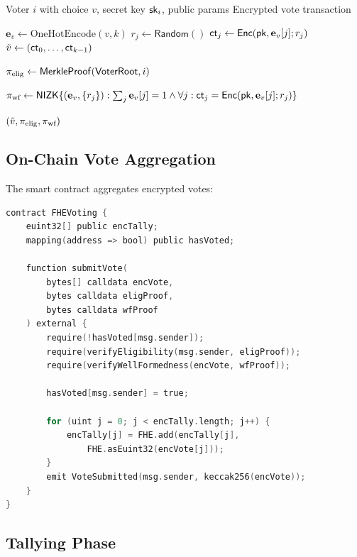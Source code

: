 \documentclass{../shared/luxfhe}
\begin{document}
\begin{algorithm}
\caption{Vote Submission}
\begin{algorithmic}[1]
\Require Voter $i$ with choice $v$, secret key $\mathsf{sk}_i$, public params
\Ensure Encrypted vote transaction

\State $\mathbf{e}_v \gets \text{OneHotEncode}(v, k)$
    \State $r_j \gets \mathsf{Random}()$
    \State $\mathsf{ct}_j \gets \mathsf{Enc}(\mathsf{pk}, \mathbf{e}_v[j]; r_j)$
\EndFor
\State $\tilde{v} \gets (\mathsf{ct}_0, \ldots, \mathsf{ct}_{k-1})$

\State {}
\State $\pi_{\text{elig}} \gets \mathsf{MerkleProof}(\mathsf{VoterRoot}, i)$

\State {}
\State $\pi_{\text{wf}} \gets \mathsf{NIZK}\{(\mathbf{e}_v, \{r_j\}) : \sum_j \mathbf{e}_v[j] = 1 \land \forall j: \mathsf{ct}_j = \mathsf{Enc}(\mathsf{pk}, \mathbf{e}_v[j]; r_j)\}$

\State \Return $(\tilde{v}, \pi_{\text{elig}}, \pi_{\text{wf}})$
\end{algorithmic}
\end{algorithm}

\subsection{On-Chain Vote Aggregation}

The smart contract aggregates encrypted votes:

\begin{lstlisting}[language=C,caption=Vote Aggregation Contract]
contract FHEVoting {
    euint32[] public encTally;
    mapping(address => bool) public hasVoted;
    
    function submitVote(
        bytes[] calldata encVote,
        bytes calldata eligProof,
        bytes calldata wfProof
    ) external {
        require(!hasVoted[msg.sender]);
        require(verifyEligibility(msg.sender, eligProof));
        require(verifyWellFormedness(encVote, wfProof));
        
        hasVoted[msg.sender] = true;
        
        for (uint j = 0; j < encTally.length; j++) {
            encTally[j] = FHE.add(encTally[j], 
                FHE.asEuint32(encVote[j]));
        }
        emit VoteSubmitted(msg.sender, keccak256(encVote));
    }
}
\end{lstlisting}

\subsection{Tallying Phase}
\end{document}
